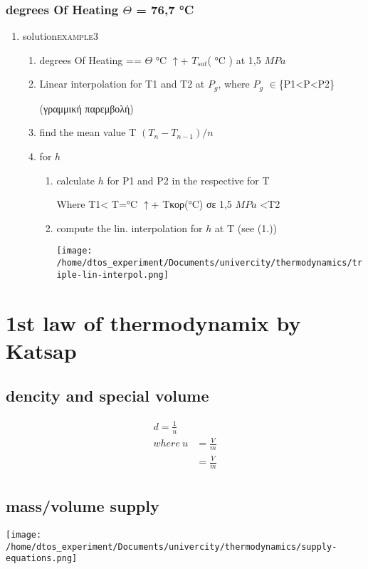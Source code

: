 \documentclass[11pt]{article}
\begin{document}
\subsubsection{degrees Of Heating \(\Theta\)  = 76,7 °C}
\label{sec:orgfee55bf}
\begin{enumerate}
\item solution\hfill{}\textsc{example3}
\label{sec:orga4cd880}
\begin{enumerate}
\item degrees Of Heating == \(\Theta\) °C \(\uparrow\)+ \(T_{sat}\)( °C ) at 1,5 \(MPa\)
\item Linear interpolation  for T1 and T2 at \(P_{g}\), where \(P_{g}\) \(\in\)\{P1<P<P2\}

(γραμμική παρεμβολή)

\item find the mean value T
\((T_{n}-T_{n-1})/n\)
\item for \(h\)
\begin{enumerate}
\item calculate \(h\) for P1 and P2 in the respective for T

Where T1<
T=°C \(\uparrow\)+ Tκορ(°C) σε 1,5 \(MPa\)
<T2

\item compute the lin. interpolation for \(h\) at T (see (1.))
\begin{center}
\texttt{[image: /home/dtos\_experiment/Documents/univercity/thermodynamics/triple-lin-interpol.png]}
\end{center}
\end{enumerate}
\end{enumerate}
\end{enumerate}
\section{1st law of thermodynamix by Katsap}
\label{sec:org4677984}
\subsection{dencity and special volume}
\label{sec:org03c247e}
\begin{equation}
\begin{align}
d = \frac{1}{u} \\
where\ u &= \frac{V}{m} \\
&= \frac{\dot{V}}{\dot{m}} \\
\end{align}
\end{equation}
\subsection{mass/volume supply}
\label{sec:org06c7368}

\begin{center}
\texttt{[image: /home/dtos\_experiment/Documents/univercity/thermodynamics/supply-equations.png]}
\end{center}
\end{document}
